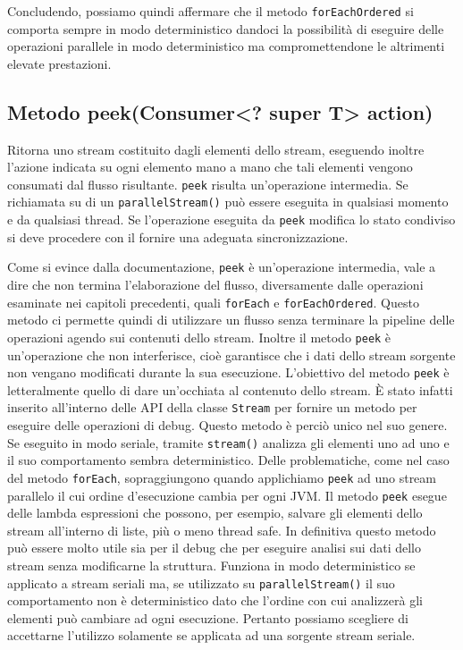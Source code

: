 			Concludendo, possiamo quindi affermare che il metodo \lstinline|forEachOrdered| si comporta sempre in modo deterministico dandoci la possibilità di eseguire delle operazioni parallele in modo deterministico ma compromettendone le altrimenti elevate prestazioni. 
		
		
		\subsection{Metodo peek(Consumer<? super T> action)}
			Ritorna uno stream costituito dagli elementi dello stream, eseguendo inoltre l'azione indicata su ogni elemento mano a mano che tali elementi vengono consumati dal flusso risultante. \lstinline|peek| risulta un'operazione intermedia. Se richiamata su di un \lstinline|parallelStream()| può essere eseguita in qualsiasi momento e da qualsiasi thread. Se l'operazione eseguita da \lstinline|peek| modifica lo stato condiviso si deve procedere con il fornire una adeguata sincronizzazione. 
			
			Come si evince dalla documentazione, \lstinline|peek| è un'operazione intermedia, vale a dire che non termina l'elaborazione del flusso, diversamente dalle operazioni esaminate nei capitoli precedenti, quali \lstinline|forEach| e \lstinline|forEachOrdered|. Questo metodo ci permette quindi di utilizzare un flusso senza terminare la pipeline delle operazioni agendo sui contenuti dello stream. Inoltre il metodo \lstinline|peek| è un'operazione che non interferisce, cioè garantisce che i dati dello stream sorgente non vengano modificati durante la sua esecuzione. L'obiettivo del metodo \lstinline|peek| è letteralmente quello di dare un'occhiata al contenuto dello stream. \`E stato infatti inserito all'interno delle API della classe \lstinline|Stream| per fornire un metodo per eseguire delle operazioni di debug. Questo metodo è perciò unico nel suo genere. Se eseguito in modo seriale, tramite \lstinline|stream()| analizza gli elementi uno ad uno e il suo comportamento sembra deterministico. Delle problematiche, come nel caso del metodo \lstinline|forEach|, sopraggiungono quando applichiamo \lstinline|peek| ad uno stream parallelo il cui ordine d'esecuzione cambia per ogni JVM. Il metodo \lstinline|peek| esegue delle lambda espressioni che possono, per esempio, salvare gli elementi dello stream all'interno di liste, più o meno thread safe. In definitiva questo metodo può essere molto utile sia per il debug che per eseguire analisi sui dati dello stream senza modificarne la struttura. Funziona in modo deterministico se applicato a stream seriali ma, se utilizzato su \lstinline|parallelStream()| il suo comportamento non è deterministico dato che l'ordine con cui analizzerà gli elementi può cambiare ad ogni esecuzione. Pertanto possiamo scegliere di accettarne l'utilizzo solamente se applicata ad una sorgente stream seriale.

